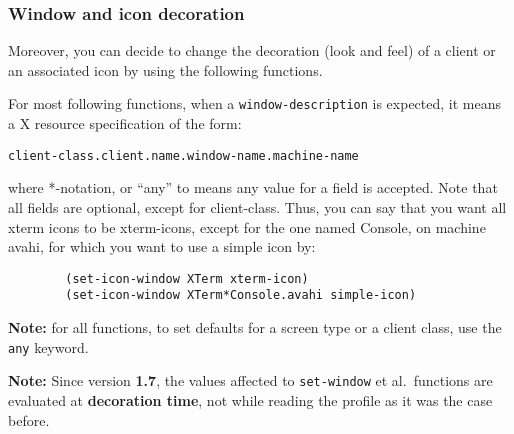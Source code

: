 \subsubsection{Window and icon decoration}

Moreover, you can decide to change the decoration (look and feel)
of a client or an associated icon by using the following functions.

For most following functions, when a \verb|window-description| is expected, it
means a X resource specification of the form:
\begin{verbatim}
client-class.client.name.window-name.machine-name
\end{verbatim}
where *-notation, or ``any'' to means any value for a field is accepted. Note
that all fields are optional, except for client-class.
Thus, you can say that you want all xterm icons to be xterm-icons, except for
the one named Console, on machine avahi, for which you want to use
a simple icon by:
{\exemplefont\begin{verbatim}
        (set-icon-window XTerm xterm-icon)
        (set-icon-window XTerm*Console.avahi simple-icon)
\end{verbatim}}

{\bf Note:} for all functions, to set defaults for a screen type or a client
class, use the \verb"any" keyword.

{\bf Note:} Since version {\bf 1.7}, the values affected to \verb|set-window|
et al.\ functions are evaluated at {\bf decoration time}, not while reading the
profile as it was the case before.

